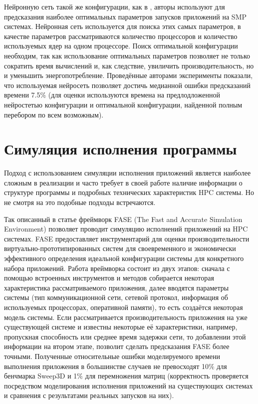 		Нейронную сеть такой же конфигурации, как в \cite{ML_SMG2000}, авторы \cite{ML_PROC_KERN} используют для предсказания наиболее оптимальных параметров запусков приложений на SMP системах. Нейронная сеть используется для поиска этих самых параметров, в качестве параметров рассматриваются количество процессоров и количество используемых ядер на одном процессоре. Поиск оптимальной конфигурации необходим, так как использование оптимальных параметров позволяет не только сократить время вычислений и, как следствие, увиличить производительность, но и уменьшить энергопотребление. Проведённые авторами эксперименты показали, что используемая нейросеть позволяет достичь медианной ошибки предсказаний времени 7.5\% (для оценки используются времена на предлодложенной нейростетью конфигурации и оптимальной конфигурации, найденной полным перебором по всем возможным).

	\section{Симуляция исполнения программы}
		Подход с использованием симуляции исполнения приложений является наиболее сложным в реализации и часто требует в своей работе наличие информации о структуре программы и подробных технических характеристик HPC системы. Но не смотря на это подобные подходы встречаются.

		Так описанный в статье \cite{simulation_FASE} фреймворк FASE (The Fast and Accurate Simulation Environment) позволяет проводит симуляцию исполнений приложений на HPC системах. FASE предоставляет инструментарий для оценки производительности виртуально-прототипированных систем для своевременного и экономически эффективного определения идеальной конфигурации системы для конкретного набора приложений. Работа вреймворка состоит из двух этапов: сначала с помощью встроенных инструментов и методов собирается некоторая характеристика рассматриваемого приложения, далее вводятся параметры системы (тип коммуникационной сети, сетевой протокол, информация об используемых процессорах, оперативной памяти),	то есть создаётся некоторая модель системы. Если рассматривается производительность приложения на уже существующей системе и известны некоторые её характеристики, например, пропускная способность или среднее время задержки сети, то добавлении этой информации на втором этапе, позволит сделать предсказания FASE более точными. Полученные относительные ошибки моделируемого времени выполнения приложения в большинстве случаев не превосходят 10\% для бенчмарка Sweep3D и 1\% для перемножения матриц (корректность проверяется посредством моделирования исполнения приложений на существующих системах и сравнения с результатами реальных запусков на них).
		
